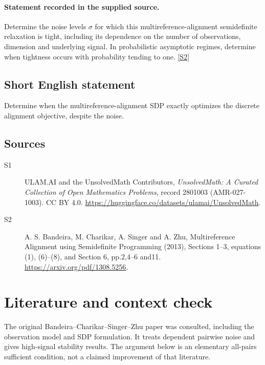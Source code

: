 \documentclass[11pt]{article}
\begin{document}
\paragraph{Statement recorded in the supplied source.}
Determine the noise levels $\sigma$ for which this multireference-alignment semidefinite relaxation is tight, including its dependence on the number of observations, dimension and underlying signal. In probabilistic asymptotic regimes, determine when tightness occurs with probability tending to one. \href{https://arxiv.org/pdf/1308.5256}{[S2]}
\subsection{Short English statement}
Determine when the multireference-alignment SDP exactly optimizes the discrete alignment objective, despite the noise.
\subsection{Sources}
\begin{description}
\item[S1] ULAM.AI and the UnsolvedMath Contributors, \emph{UnsolvedMath: A Curated Collection of Open Mathematics Problems}, record 2801003 (AMR-027-1003). CC BY 4.0. \url{https://huggingface.co/datasets/ulamai/UnsolvedMath}.
\item[S2] A. S. Bandeira, M. Charikar, A. Singer and A. Zhu, Multireference Alignment using Semidefinite Programming (2013), Sections 1--3, equations (1), (6)--(8), and Section 6, pp.2,4--6 and11. \url{https://arxiv.org/pdf/1308.5256}.
\end{description}
\label{end:2801003}

\section{Literature and context check}
The original Bandeira--Charikar--Singer--Zhu paper was consulted, including
the observation model and SDP formulation. It treats dependent pairwise noise and
gives high-signal stability results. The argument below is an elementary
all-pairs sufficient condition, not a claimed improvement of that literature.
\end{document}
